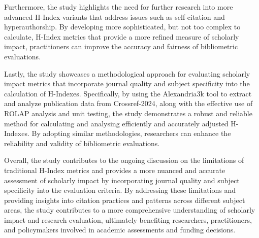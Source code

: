 Furthermore, the study highlights the need for further research into more
advanced H-Index variants that address issues such as self-citation and
hyperauthorship. By developing more sophisticated, but not too complex to
calculate, H-Index metrics that provide a more refined measure of scholarly
impact, practitioners can improve the accuracy and fairness of
bibliometric evaluations.

Lastly, the study showcases a methodological approach for evaluating scholarly
impact metrics that incorporate journal quality and subject specificity into
the calculation of H-Indexes. Specifically, by using the Alexandria3k tool to
extract and analyze publication data from Crossref-2024, along with the
effective use of ROLAP analysis and unit testing, the study demonstrates a robust
and reliable method for calculating and analysing efficiently and accurately adjusted
H-Indexes. By adopting similar methodologies, researchers can
enhance the reliability and validity of bibliometric evaluations.

Overall, the study contributes to the ongoing discussion on the limitations of
traditional H-Index metrics and provides a more nuanced and accurate assessment
of scholarly impact by incorporating journal quality and subject specificity
into the evaluation criteria. By addressing these limitations and providing
insights into citation practices and patterns across different subject areas,
the study contributes to a more comprehensive understanding of scholarly impact
and research evaluation, ultimately benefiting researchers, practitioners, and
policymakers involved in academic assessments and funding decisions. %
